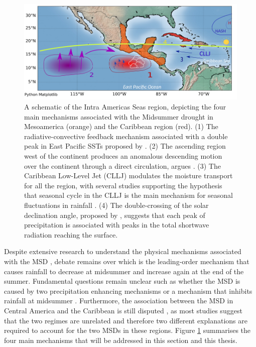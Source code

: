 \begin{figure}[t!]
\includegraphics[width=\linewidth]{figures/back_msd_diag.png}
\caption[Mechanisms of the Midsummer drought]{A schematic of the Intra Americas Seas region, depicting the four main mechanisms associated with the Midsummer drought in Mesoamerica (orange) and the Caribbean region (red). (1) The radiative-convective feedback mechanism associated with a double peak in East Pacific SSTs proposed by \cite{magana1999}. (2) The ascending region west of the continent produces an anomalous descending motion over the continent through a direct circulation, argues \cite{herrera2015}. (3) The Caribbean Low-Level Jet (CLLJ) modulates the moisture transport for all the region, with several studies supporting the hypothesis that seasonal cycle in the CLLJ is the main mechanism for seasonal fluctuations in rainfall \citep{duranquesada2017,martinez2019}. (4) The double-crossing of the solar declination angle, proposed by \cite{karnauskas2013}, suggests that each peak of precipitation is associated with peaks in the total shortwave radiation reaching the surface.  }
\label{fig:msd_schematic}
\end{figure}

 Despite extensive research to understand the physical mechanisms associated with the MSD   \citep[e.g.][]{magana1999,giannini2000,gamble2008,herrera2015,maldonado2017,straffon2019}, debate remains over which is the leading-order mechanism that causes rainfall to decrease at midsummer and increase again at the end of the summer.  %
Fundamental questions remain unclear such  as whether the MSD is caused by two precipitation enhancing mechanisms \citep{karnauskas2013} or a mechanism that inhibits rainfall at midsummer \citep{duranquesada2017}. 
Furthermore, the association between the MSD in Central America and the Caribbean is still disputed \citep{gamble2008}, as most studies suggest that the two regimes are unrelated and therefore two different explanations are required to account for the two MSDs in these regions. 
Figure \ref{fig:msd_schematic} summarises the four main mechanisms that will be addressed in this section and this thesis. 

